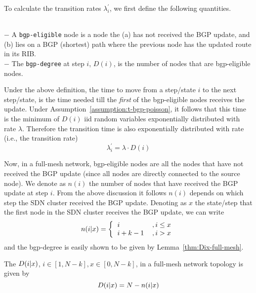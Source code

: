To calculate the transition rates $\lambda_{i}^{'}$, we first define the following quantities.
\begin{definition}\label{def:bgp-degree}~\\
$-$ A \texttt{bgp-eligible} node is a node the (a) has not received the BGP update, and (b) lies on a BGP (shortest) path where the previous node has the updated route in its RIB.~\\ %
$-$ The \texttt{bgp-degree} at step $i$, $D(i)$, is the number of nodes that are bgp-eligible nodes.%
\end{definition}
Under the above definition, the time to move from a step/state $i$ to the next step/state, is the time needed till the \textit{first} of the bgp-eligible nodes receives the update. Under Assumption~\ref{assumption:t-bgp-poisson}, it follows that this time is the minimum of $D(i)$ iid random variables exponentially distributed with rate $\lambda$. Therefore the transition time is also exponentially distributed with rate (i.e., the transition rate)
\begin{equation}\label{eq:transition-rate-lambda-prime}
\lambda_{i}^{'} = \lambda\cdot D(i)
\end{equation}


Now, in a full-mesh network, bgp-eligible nodes are all the nodes that have not received the BGP update (since all nodes are directly connected to the source node). We denote as $n(i)$ the number of nodes that have received the BGP update at step $i$. From the above discussion it follows $n(i)$ depends on which step the SDN cluster received the BGP update. Denoting as $x$ the state/step that the first node in the SDN cluster receives the BGP update, we can write
\begin{equation}\label{eq:n(i)}
n(i|x) = \left\{
\begin{tabular}{ll}
$i$	& $, i\leq x$ \\
$i+k-1$	& $, i>x$
\end{tabular}
\right.
\end{equation}
and the bgp-degree is easily shown to be given by Lemma~\ref{thm:Dix-full-mesh}.
\begin{lemma}\label{thm:Dix-full-mesh}
The \bgp $D(i|x)$, $i\in[1,N-k], x\in[0,N-k]$, in a full-mesh network topology is given by
\begin{equation}
D(i|x) = N-n(i|x)
\end{equation}
\end{lemma}


